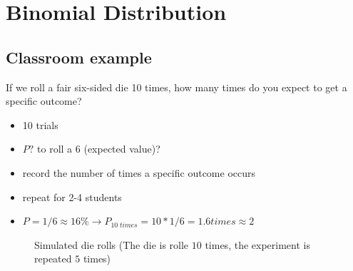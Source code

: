 \documentclass[
  a4paper,
]{scrbook}
\providecommand{\tightlist}{%
  \setlength{\itemsep}{0pt}\setlength{\parskip}{0pt}}\usepackage{longtable,booktabs,array}
\begin{document}
\section{Binomial Distribution}\label{binomial-distribution}

\subsection{Classroom example}\label{classroom-example}

If we roll a fair six-sided die 10 times, how many times do you expect
to get a specific outcome?

\begin{itemize}
\tightlist
\item
  10 trials
\item
  \(P?\) to roll a \(6\) (expected value)?
\item
  record the number of times a specific outcome occurs
\item
  repeat for 2-4 students
\end{itemize}

\begin{itemize}
\tightlist
\item
  \(P = 1/6 \approx 16\% \rightarrow P_{10\;times} = 10 * 1/6 = 1.6 times \approx 2\)
\end{itemize}

\begin{figure}[ht]


\caption{\label{fig-sim-dice}Simulated die rolls (The die is rolle
\(10\) times, the experiment is repeated \(5\) times)}

\end{figure}%
\end{document}
